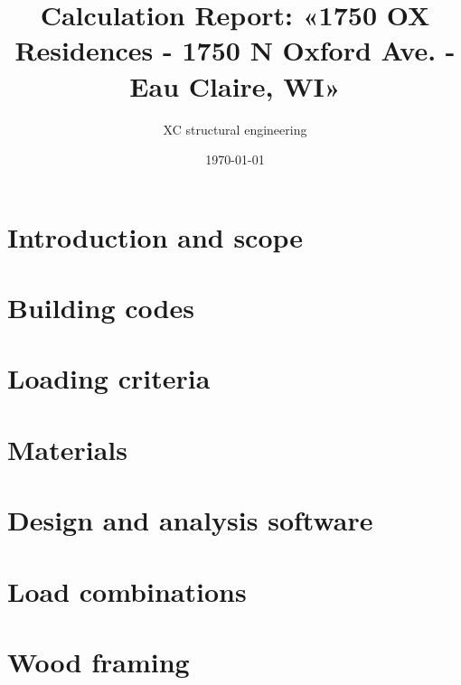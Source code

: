 

\usepackage{array, boldline, makecell, booktabs}
\newcommand\btrule[1]{\specialrule{#1}{0pt}{0pt}}
\usepackage{colortbl}
\usepackage{multicol,caption}               %
\usepackage{xcolor}
\usepackage{hyperref}
\newenvironment{Figure}
  {\par\medskip\noindent\minipage{\linewidth}}
  {\endminipage\par\medskip}
\usepackage{caption}
\usepackage[section]{placeins}
\usepackage{units}
\usepackage{draftwatermark}

\title{Calculation Report: «1750 OX Residences - 1750 N Oxford Ave. - Eau Claire, WI» }
\author{XC structural engineering}
\date{\today}
\newcommand{\revision}{0.1}
\newcommand{\titdocum}{Calculation Report}

\maketitle
\tableofcontents
\listoftables
\listoffigures
\cleardoublepage
\section{Introduction and scope}

\section{Building codes}

\section{Loading criteria}

\section{Materials}

\section{Design and analysis software}

\section{Load combinations}

\section{Wood framing}

